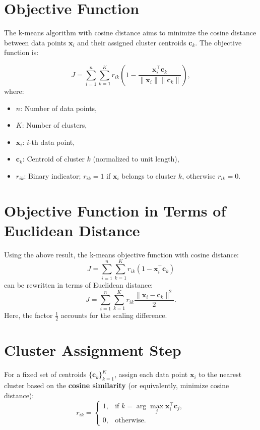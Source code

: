 \section*{Objective Function}

The k-means algorithm with cosine distance aims to minimize the cosine distance between data points \( \mathbf{x}_i \) and their assigned cluster centroids \( \mathbf{c}_k \). The objective function is:

\[
J = \sum_{i=1}^{n} \sum_{k=1}^{K} r_{ik} \left( 1 - \frac{\mathbf{x}_i^\top \mathbf{c}_k}{\|\mathbf{x}_i\| \|\mathbf{c}_k\|} \right),
\]
where:
\begin{itemize}
    \item \( n \): Number of data points,
    \item \( K \): Number of clusters,
    \item \( \mathbf{x}_i \): \( i \)-th data point,
    \item \( \mathbf{c}_k \): Centroid of cluster \( k \) (normalized to unit length),
    \item \( r_{ik} \): Binary indicator; \( r_{ik} = 1 \) if \( \mathbf{x}_i \) belongs to cluster \( k \), otherwise \( r_{ik} = 0 \).
\end{itemize}

\section*{Objective Function in Terms of Euclidean Distance}

Using the above result, the k-means objective function with cosine distance:
\[
J = \sum_{i=1}^{n} \sum_{k=1}^{K} r_{ik} \left( 1 - \mathbf{x}_i^\top \mathbf{c}_k \right)
\]
can be rewritten in terms of Euclidean distance:
\[
J = \sum_{i=1}^{n} \sum_{k=1}^{K} r_{ik} \frac{\|\mathbf{x}_i - \mathbf{c}_k\|^2}{2}.
\]
Here, the factor \( \frac{1}{2} \) accounts for the scaling difference.

\section*{Cluster Assignment Step}

For a fixed set of centroids \( \{ \mathbf{c}_k \}_{k=1}^K \), assign each data point \( \mathbf{x}_i \) to the nearest cluster based on the \textbf{cosine similarity} (or equivalently, minimize cosine distance):
\[
r_{ik} =
\begin{cases}
1, & \text{if } k = \arg\max_{j} \mathbf{x}_i^\top \mathbf{c}_j, \\
0, & \text{otherwise.}
\end{cases}
\]
